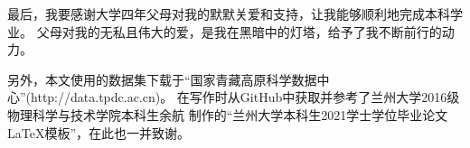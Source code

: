 \documentclass[AutoFakeBold]{LZUThesis}
\begin{document}
最后，我要感谢大学四年父母对我的默默关爱和支持，让我能够顺利地完成本科学业。
父母对我的无私且伟大的爱，是我在黑暗中的灯塔，给予了我不断前行的动力。

另外，本文使用的数据集下载于“国家青藏高原科学数据中心”(http://data.tpdc.ac.cn)。
在写作时从GitHub中获取并参考了兰州大学2016级物理科学与技术学院本科生余航
制作的“兰州大学本科生2021学士学位毕业论文LaTeX模板”，在此也一并致谢。

\rightline{}



\supervisorcomment{}


\committeecomment{}

\finalgrade{}

\mainmatter
{}
\Grade
\clearpage
\end{document}

